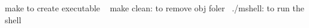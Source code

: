make to create executable ~\newline
make clean\+: to remove obj foler~\newline
./mshell\+: to run the shell ~\newline
